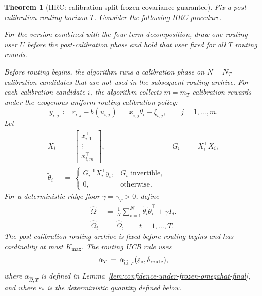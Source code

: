 \documentclass{article} %
\newtheorem{theorem}{Theorem}
\begin{document}
\begin{theorem}[HRC: calibration-split frozen-covariance guarantee]
\label{thm:err-control-calibration-split-final}
Fix a post-calibration routing horizon \(T\). Consider the following
HRC procedure.

For the version combined with the four-term decomposition, draw one routing
user \(U\) before the post-calibration phase and hold that user fixed for all
\(T\) routing rounds.

Before routing begins, the algorithm runs a calibration phase on
\(N=N_T\) calibration candidates that are not used in the subsequent routing
archive.  For each calibration candidate \(i\), the algorithm collects
\(m=m_T\) calibration rewards under the exogenous uniform-routing calibration
policy:
\begin{equation}
y_{i,j}
\,\coloneqq\,
r_{i,j}-b(u_{i,j})
\,=\,
x_{i,j}^{\top}\theta_i+\xi_{i,j},
\qquad j=1,\ldots,m.
\end{equation}
Let
\begin{equation}
\begin{aligned}
X_i
&\,=\,
\begin{bmatrix}
x_{i,1}^{\top}\\
\vdots\\
x_{i,m}^{\top}
\end{bmatrix},
&
G_i
&\,=\,
X_i^\top X_i,
\\
\widetilde\theta_i
&\,=\,
\begin{cases}
G_i^{-1}X_i^\top y_i, & G_i\text{ invertible},\\
0, & \text{otherwise}.
\end{cases}
\end{aligned}
\end{equation}
For a deterministic ridge floor \(\gamma=\gamma_T>0\), define
\begin{equation}
\begin{aligned}
\widehat\Omega
&\,=\,
\frac1N\sum_{i=1}^N\widetilde\theta_i\widetilde\theta_i^\top+\gamma I_d.
\\
\widehat\Omega_t
&\,=\,
\widehat\Omega,
\qquad t=1,\ldots,T.
\end{aligned}
\end{equation}
The post-calibration routing archive is fixed before routing begins and has
cardinality at most \(K_{\max}\).  The routing UCB rule uses
\begin{equation}
\alpha_T
\,=\,
\alpha_{\widehat\Omega,T}(\varepsilon_*,\delta_{\rm route}),
\end{equation}
where \(\alpha_{\widehat\Omega,T}\) is defined in
Lemma~\ref{lem:confidence-under-frozen-omegahat-final}, and where
\(\varepsilon_*\) is the deterministic quantity defined below.


\end{theorem}
\end{document}
